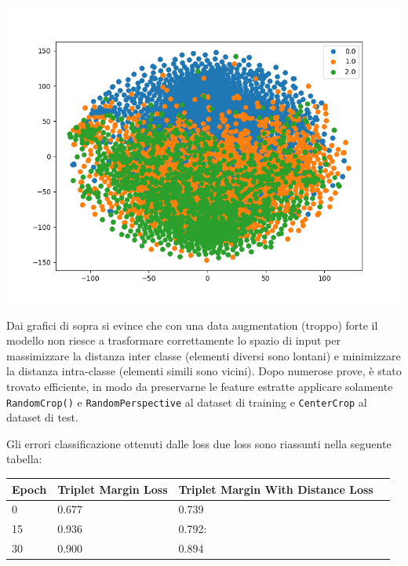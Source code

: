 \documentclass[11pt]{article}
\begin{document}
\begin{center}
\begin{minipage}{0.3\linewidth}
    \includegraphics[width=\linewidth]{09.png}
    \end{minipage}
\end{center}

Dai grafici di sopra si evince che con una data augmentation (troppo) forte il modello non riesce a trasformare correttamente lo spazio di input per massimizzare la distanza inter classe (elementi diversi sono lontani)
e minimizzare la distanza intra-classe (elementi simili sono vicini). Dopo numerose prove, è stato
trovato efficiente, in modo da preservarne le feature estratte applicare solamente \texttt{RandomCrop()} e \texttt{RandomPerspective} al dataset di training e \texttt{CenterCrop} al dataset di test.

\pagebreak

Gli errori classificazione ottenuti dalle loss due loss sono riassunti nella seguente tabella:

\begin{center}
    \begin{tabular}{ | l | l | l | p{5cm} |}
    \hline
    Epoch & Triplet Margin Loss & Triplet Margin With Distance Loss \\ \hline
    0 & 0.677 & 0.739 \\ \hline
    15 & 0.936 & 0.792: \\ \hline
    30 & 0.900 & 0.894  \\
    \hline
    \end{tabular}
\end{center}
\end{document}
